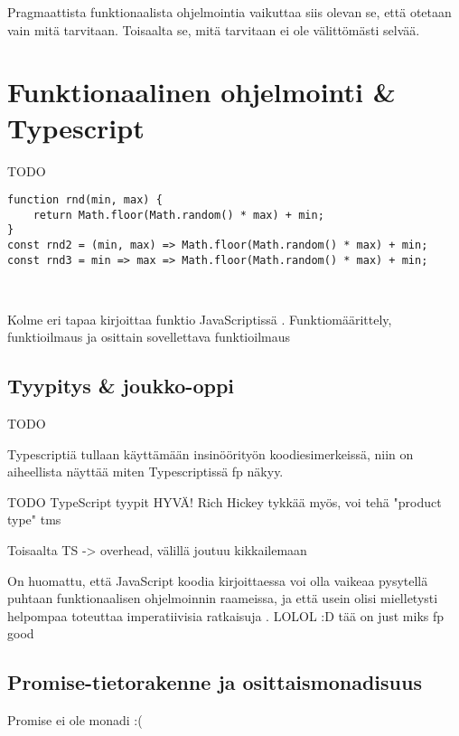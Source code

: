 Pragmaattista funktionaalista ohjelmointia vaikuttaa siis olevan se, että otetaan vain mitä tarvitaan. Toisaalta se, mitä tarvitaan ei ole välittömästi selvää.

\section{Funktionaalinen ohjelmointi \& Typescript}

TODO


\begin{code}
	\begin{verbatim}
function rnd(min, max) { 
	return Math.floor(Math.random() * max) + min;
}
const rnd2 = (min, max) => Math.floor(Math.random() * max) + min;
const rnd3 = min => max => Math.floor(Math.random() * max) + min;



\end{verbatim}
	\caption{Kolme eri tapaa kirjoittaa funktio JavaScriptissä \cite{okhravi-g-discussion}. Funktiomäärittely, funktioilmaus ja osittain sovellettava funktioilmaus}
	\label{code:javascript_function_types}
\end{code}

\subsection{Tyypitys \& joukko-oppi}

TODO

Typescriptiä tullaan käyttämään insinöörityön koodiesimerkeissä, niin on aiheellista näyttää miten Typescriptissä fp näkyy.

TODO TypeScript tyypit HYVÄ! Rich Hickey tykkää myös, voi tehä "product type" tms

Toisaalta TS -> overhead, välillä joutuu kikkailemaan

On huomattu, että JavaScript koodia kirjoittaessa voi olla vaikeaa pysytellä puhtaan funktionaalisen ohjelmoinnin raameissa, ja että usein olisi mielletysti helpompaa toteuttaa imperatiivisia ratkaisuja \cite[44]{cantarella_fp_haitat}.  LOLOL :D tää on just miks fp good

\subsection{Promise-tietorakenne ja osittaismonadisuus}

Promise ei ole monadi :( \cite{read-it-later-11481,promises-spec-94}

